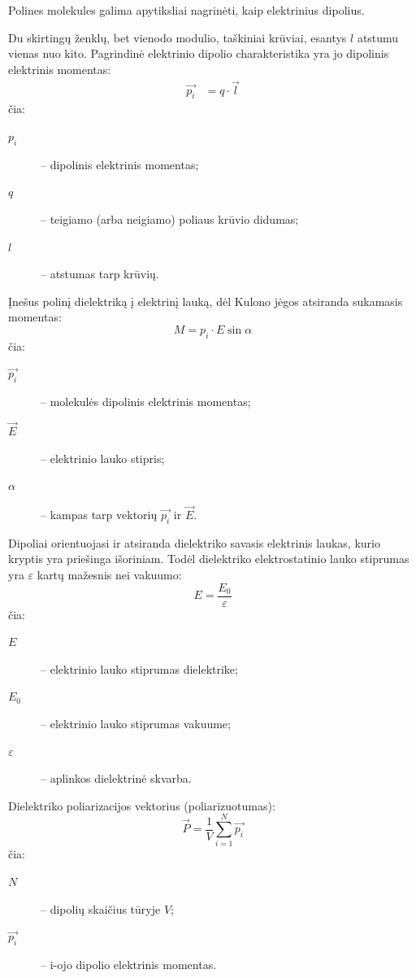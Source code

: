 Polines molekules galima apytiksliai nagrinėti, kaip elektrinius dipolius.

\begin{defn}
  Du skirtingų ženklų, bet vienodo modulio, taškiniai krūviai,
  esantys $l$ atstumu vienas nuo kito. Pagrindinė elektrinio dipolio
  charakteristika yra jo dipolinis elektrinis momentas:
  \begin{align*}
    \vec{p_{i}} &= q \cdot \vec{l}
  \end{align*}
  čia:
  \begin{description}
    \item[$p_{i}$] – dipolinis elektrinis momentas;
    \item[$q$] – teigiamo (arba neigiamo) poliaus krūvio didumas;
    \item[$l$] – atstumas tarp krūvių.
  \end{description}
\end{defn}

Įnešus polinį dielektriką į elektrinį lauką, dėl Kulono jėgos atsiranda
sukamasis momentas:
\begin{equation*}
  M = p_{i} \cdot E \sin \alpha
\end{equation*}
čia:
\begin{description}
  \item[$\vec{p_{i}}$] – molekulės dipolinis elektrinis momentas;
  \item[$\vec{E}$] – elektrinio lauko stipris;
  \item[$\alpha$] – kampas tarp vektorių $\vec{p_{i}}$ ir $\vec{E}$.
\end{description}
Dipoliai orientuojasi ir atsiranda dielektriko savasis elektrinis
laukas, kurio kryptis yra priešinga išoriniam. Todėl dielektriko
elektrostatinio lauko stiprumas yra $\varepsilon$ kartų mažesnis
nei vakuumo:
\begin{equation*}
  E = \frac{E_{0}}{\varepsilon}
\end{equation*}
čia:
\begin{description}
  \item[$E$] – elektrinio lauko stiprumas dielektrike;
  \item[$E_{0}$] – elektrinio lauko stiprumas vakuume;
  \item[$\varepsilon$] – aplinkos dielektrinė skvarba.
\end{description}
Dielektriko poliarizacijos vektorius (poliarizuotumas):
\begin{equation*}
  \vec{P} = \frac{1}{V} \sum _{i=1} ^{N} \vec{p_{i}}
\end{equation*}
čia:
\begin{description}
  \item[$N$] – dipolių skaičius tūryje $V$;
  \item[$\vec{p_{i}}$] – i-ojo dipolio elektrinis momentas.
\end{description}

